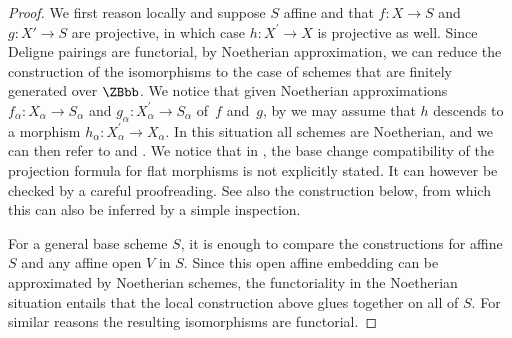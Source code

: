 \begin{proof}

We first reason locally and suppose $S$ affine and that $f \colon X \to S$ and $g \colon X' \to S$ are projective, in which case $h\colon X^{\prime}\to X$ is projective as well. Since Deligne pairings are functorial, by Noetherian approximation, we can reduce the construction of the isomorphisms to the case of schemes that are finitely generated over $\ZBbb$. We notice that given Noetherian approximations $f_{\alpha}\colon X_{\alpha}\to S_{\alpha}$ and $g_{\alpha}\colon X^{\prime}_{\alpha}\to S_{\alpha}$ of~$f$ and~$g$, by \cite[\href{https://stacks.math.columbia.edu/tag/01ZM}{01ZM}]{stacks-project} we may assume that $h$ descends to a morphism $h_{\alpha}\colon X^{\prime}_{\alpha}\to X_{\alpha}$. In this situation all schemes are Noetherian, and we can then refer to \cite[\textsection IV.2]{Elkikfib} and \cite[]{Munoz}. We notice that in \cite{Munoz}, the base change compatibility of the projection formula for flat morphisms is not explicitly stated. It can however be checked by a careful proofreading. See also the construction below, from which this can also be inferred by a simple inspection.

For a general base scheme $S$, it is enough to compare the constructions for affine~$S$ and any affine open $V$ in $S$. Since this open affine embedding can be approximated by Noetherian schemes, the functoriality in the Noetherian situation entails that the local construction above glues together on all of $S$. For similar reasons the resulting isomorphisms are functorial.


\end{proof}
